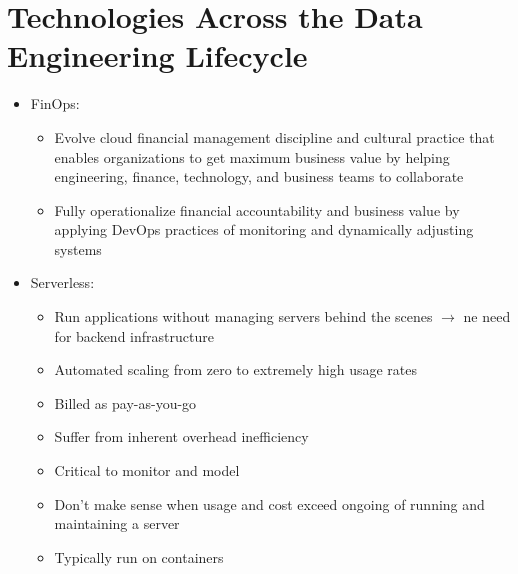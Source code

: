 \documentclass[11pt]{scrartcl}
\begin{document}
\section*{Technologies Across the Data Engineering Lifecycle}
\begin{itemize}
	\item FinOps:
	\begin{itemize}
		\item Evolve cloud financial management discipline and cultural practice that enables organizations to get maximum business value by helping engineering, finance, technology, and business teams to collaborate
		\item Fully operationalize financial accountability and business value by applying DevOps practices of monitoring and dynamically adjusting systems
	\end{itemize}
	\item Serverless:
	\begin{itemize}
		\item Run applications without managing servers behind the scenes $\to$ ne need for backend infrastructure
		\item Automated scaling from zero to extremely high usage rates
		\item Billed as pay-as-you-go
		\item Suffer from inherent overhead inefficiency
		\item Critical to monitor and model
		\item Don't make sense when usage and cost exceed ongoing of running and maintaining a server
		\item Typically run on containers
	\end{itemize}
\end{itemize}

\newpage
\end{document}

